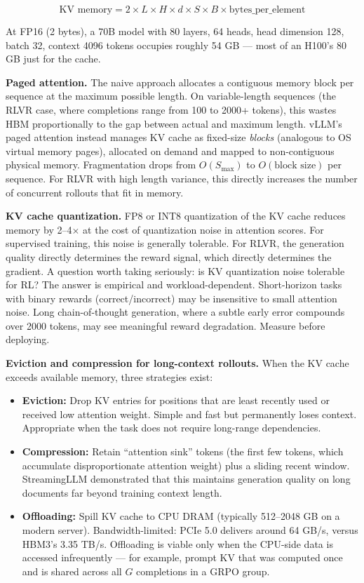 $$\text{KV memory} = 2 \times L \times H \times d \times S \times B \times \text{bytes\_per\_element}$$

At FP16 (2 bytes), a 70B model with 80 layers, 64 heads, head dimension 128, batch 32, context 4096 tokens occupies roughly 54 GB --- most of an H100's 80 GB just for the cache.

\textbf{Paged attention.} The naive approach allocates a contiguous memory block per sequence at the maximum possible length. On variable-length sequences (the RLVR case, where completions range from 100 to 2000+ tokens), this wastes HBM proportionally to the gap between actual and maximum length. vLLM's paged attention instead manages KV cache as fixed-size \textit{blocks} (analogous to OS virtual memory pages), allocated on demand and mapped to non-contiguous physical memory. Fragmentation drops from $O(S_\text{max})$ to $O(\text{block size})$ per sequence. For RLVR with high length variance, this directly increases the number of concurrent rollouts that fit in memory.

\textbf{KV cache quantization.} FP8 or INT8 quantization of the KV cache reduces memory by 2--4$\times$ at the cost of quantization noise in attention scores. For supervised training, this noise is generally tolerable. For RLVR, the generation quality directly determines the reward signal, which directly determines the gradient. A question worth taking seriously: is KV quantization noise tolerable for RL? The answer is empirical and workload-dependent. Short-horizon tasks with binary rewards (correct/incorrect) may be insensitive to small attention noise. Long chain-of-thought generation, where a subtle early error compounds over 2000 tokens, may see meaningful reward degradation. Measure before deploying.

\textbf{Eviction and compression for long-context rollouts.} When the KV cache exceeds available memory, three strategies exist:
\begin{itemize}
  \item \textbf{Eviction:} Drop KV entries for positions that are least recently used or received low attention weight. Simple and fast but permanently loses context. Appropriate when the task does not require long-range dependencies.
  \item \textbf{Compression:} Retain ``attention sink'' tokens (the first few tokens, which accumulate disproportionate attention weight) plus a sliding recent window. StreamingLLM demonstrated that this maintains generation quality on long documents far beyond training context length.
  \item \textbf{Offloading:} Spill KV cache to CPU DRAM (typically 512--2048 GB on a modern server). Bandwidth-limited: PCIe 5.0 delivers around 64 GB/s, versus HBM3's 3.35 TB/s. Offloading is viable only when the CPU-side data is accessed infrequently --- for example, prompt KV that was computed once and is shared across all $G$ completions in a GRPO group.
\end{itemize}

